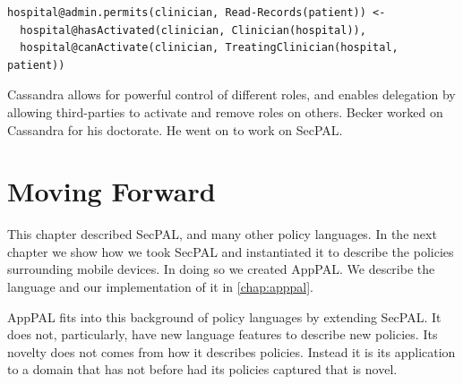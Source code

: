 \documentclass[thesis.tex]{subfiles}
\begin{document}
\begin{lstlisting}
hospital@admin.permits(clinician, Read-Records(patient)) <-
  hospital@hasActivated(clinician, Clinician(hospital)),
  hospital@canActivate(clinician, TreatingClinician(hospital, patient))
\end{lstlisting}

Cassandra allows for powerful control of different roles, and enables
delegation by allowing third-parties to activate and remove roles
on others.  
Becker worked on Cassandra for his doctorate.  He went on to work on SecPAL.

\section{Moving Forward}

This chapter described SecPAL, and many other policy languages.
In the next chapter we show how we took SecPAL and instantiated it to describe the policies surrounding mobile devices.
In doing so we created AppPAL.  We describe the language and our implementation of it in \autoref{chap:apppal}.

AppPAL fits into this background of policy languages by extending SecPAL.
It does not, particularly, have new language features to describe new policies.
Its novelty does not comes from how it describes policies.
Instead it is its application to a domain that has not before had its policies captured that is novel. 
\end{document}
